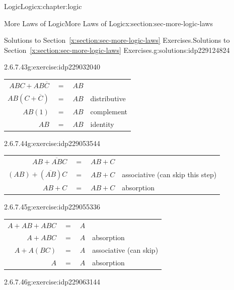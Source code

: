 \documentclass[twoside,10pt,]{book}
\newcommand{\tabularfont}{\relax}
\newcommand{\xreffont}{\relax}
\numberwithin{equation}{section}
\begin{document}
\begin{chapterptx}{Logic}{}{Logic}{}{}{x:chapter:logic}
\begin{sectionptx}{More Laws of Logic}{}{More Laws of Logic}{}{}{x:section:sec-more-logic-laws}
\begin{solutions-subsection}{Solutions to Section~{\xreffont\ref*{x:section:sec-more-logic-laws}} Exercises.}{}{Solutions to Section~{\xreffont\ref*{x:section:sec-more-logic-laws}} Exercises.}{}{}{g:solutions:idp229124824}
\begin{exercisegroup}
\begin{divisionsolutioneg}{2.6.7.43}{}{g:exercise:idp229032040}
\par\smallskip%
\noindent\hypertarget{g:solution:idp229033064-main}{}\begin{center}%
{\tabularfont%
\begin{tabular}{llll}
\multicolumn{1}{r}{\(ABC+AB\overline{C}{}\)}&\(=\)&\(AB\)&\tabularnewline[0pt]
\multicolumn{1}{r}{\(AB(C+\overline{C}{})\)}&\(=\)&\(AB\)&distributive\tabularnewline[0pt]
\multicolumn{1}{r}{\(AB(1)\)}&\(=\)&\(AB\)&complement\tabularnewline[0pt]
\multicolumn{1}{r}{\(AB\)}&\(=\)&\(AB\)&identity
\end{tabular}
}%
\end{center}%
\end{divisionsolutioneg}%
\begin{divisionsolutioneg}{2.6.7.44}{}{g:exercise:idp229053544}%
\par\smallskip%
\noindent\hypertarget{g:solution:idp229049576-main}{}\begin{center}%
{\tabularfont%
\begin{tabular}{llll}
\multicolumn{1}{r}{\(AB+\overline{AB}C\)}&\(=\)&\(AB+C\)&\tabularnewline[0pt]
\multicolumn{1}{r}{\((AB)+(\overline{AB})C\)}&\(=\)&\(AB+C\)&associative (can skip this step)\tabularnewline[0pt]
\multicolumn{1}{r}{\(AB+C\)}&\(=\)&\(AB+C\)&absorption
\end{tabular}
}%
\end{center}%
\end{divisionsolutioneg}%
\begin{divisionsolutioneg}{2.6.7.45}{}{g:exercise:idp229055336}%
\par\smallskip%
\noindent\hypertarget{g:solution:idp229055464-main}{}\begin{center}%
{\tabularfont%
\begin{tabular}{llll}
\multicolumn{1}{r}{\(A+AB+ABC\)}&\(=\)&\(A\)&\tabularnewline[0pt]
\multicolumn{1}{r}{\(A+ABC\)}&\(=\)&\(A\)&absorption\tabularnewline[0pt]
\multicolumn{1}{r}{\(A+A(BC)\)}&\(=\)&\(A\)&associative (can skip)\tabularnewline[0pt]
\multicolumn{1}{r}{\(A\)}&\(=\)&\(A\)&absorption
\end{tabular}
}%
\end{center}%
\end{divisionsolutioneg}%
\begin{divisionsolutioneg}{2.6.7.46}{}{g:exercise:idp229063144}%
\par\smallskip%
\noindent\hypertarget{g:solution:idp229065064-main}{}\begin{center}%
{\tabularfont%
\begin{tabular}{llll}

\end{tabular}}
\end{center}
\end{divisionsolutioneg}
\end{exercisegroup}
\end{solutions-subsection}
\end{sectionptx}
\end{chapterptx}
\end{document}
